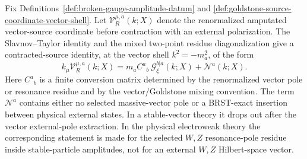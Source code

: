 \begin{controlledapproximation}
\label{ca:longitudinal-goldstone-equivalence}
Fix Definitions~\ref{def:broken-gauge-amplitude-datum} and
\ref{def:goldstone-source-coordinate-vector-shell}.  Let
\(\mathcal V_R^{\mu,a}(k;X)\) denote the renormalized amputated vector-source
coordinate before contraction with an external polarization.  The
Slavnov--Taylor identity and the mixed two-point residue diagonalization give
a contracted-source identity, at the vector shell \(k^2=-m_a^2\), of the form
\begin{equation}
  k_\mu \mathcal V_R^{\mu,a}(k;X)
  =
  m_a C^a{}_{b}\,\mathcal G_\xi^{b|a}(k;X)
  +
  \mathcal N^a(k;X).
  \label{eq:contracted-vector-goldstone-amplitude}
\end{equation}
Here \(C^a{}_{b}\) is a finite conversion matrix determined by the
renormalized vector pole or resonance residue and by the vector/Goldstone
mixing convention.  The term \(\mathcal N^a\) contains either no selected
massive-vector pole or a BRST-exact insertion between physical external
states.  In a stable-vector theory it drops out after the vector external-pole
extraction.  In the physical electroweak theory the corresponding statement is
made for the selected \(W,Z\) resonance-pole residue inside stable-particle
amplitudes, not for an external \(W,Z\) Hilbert-space vector.


\end{controlledapproximation}
